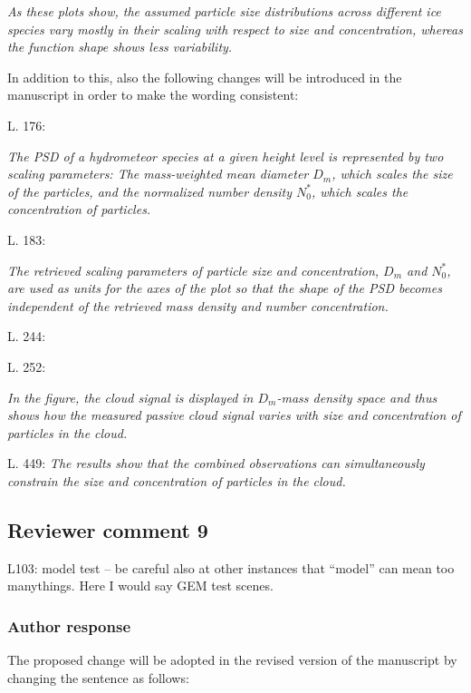 \documentclass[11pt]{scrartcl}
\begin{document}
\textit{
As these plots show, the
assumed particle size distributions across different ice species vary mostly in
their scaling with respect to size and concentration, whereas the function shape shows less
variability.}

In addition to this, also the following changes will be introduced in the manuscript in order
to make the wording consistent:


L. 176:

\textit{ The PSD of a hydrometeor species at a given height level is represented
  by two scaling parameters: The mass-weighted mean diameter $D_m$, which scales
  the size of the particles, and the normalized number density $N_0^*$, which
  scales the concentration of particles.}

L. 183:

\textit{ The retrieved scaling parameters of particle size and concentration,
  $D_m$ and $N_0^*$, are used as units for the axes of the plot so that the
  shape of the PSD becomes independent of the retrieved mass density and number
  concentration. }

L. 244:


L. 252:

\textit{ In the figure, the cloud signal is displayed in $D_m$-mass density
  space and thus shows how the measured passive cloud signal varies with size
  and concentration of particles in the cloud. }


L. 449:
\textit{The results show that the combined observations can simultaneously
  constrain the size and concentration of particles in the cloud.}


\subsection*{Reviewer comment 9}
L103: model test – be careful also at other instances that “model” can mean too manythings. Here I would say GEM test scenes.

\subsubsection*{Author response}

The proposed change will be adopted in the revised version of the manuscript by
changing the sentence as follows:
\end{document}
